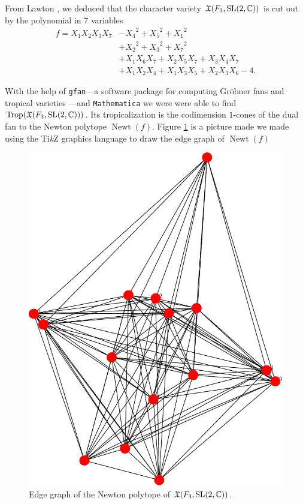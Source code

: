\documentclass[11pt]{article}
\DeclareMathOperator{\Newt}{Newt}
\begin{document}
From Lawton \cite{}, we deduced that the character variety
$\mathfrak{X}(F_3,\mathrm{SL}(2,\mathbb{C}))$ is cut out by the polynomial in $7$ variables
\begin{equation}
  \label{eq:f3-sl2c}
  \begin{aligned}
    f=X_1X_2X_3X_7&-{X_4}^2+{X_5}^2+{X_1}^2\\
    &+{X_2}^2+{X_3}^2+{X_7}^2\\
    &+X_1X_6X_7+X_2X_5X_7+X_3X_4X_7\\
    &+X_1X_2X_4+X_1X_3X_5+X_2X_3X_6-4.
  \end{aligned}
\end{equation}

With the help of \texttt{gfan}---a software package for computing Gröbner
fans and tropical varieties \cite{gfan}---and \texttt{Mathematica} we were
were able to find $\operatorname{Trop}(\mathfrak{X}(F_3,\mathrm{SL}(2,\mathbb{C})))$. Its tropicalization is
the codimension $1$-cones of the dual fan to the Newton polytope
$\Newt(f)$. Figure \ref{fig:f3-sl2c} is a picture made we made using the
Ti\textit{k}Z graphics language to draw the edge graph of $\Newt(f)$

\begin{figure}[h]
  \centering
  \includegraphics[scale=.25]{smallgraph}
  \caption{Edge graph of the Newton polytope of $\mathfrak{X}(F_3,\mathrm{SL}(2,\mathbb{C}))$.}
\label{fig:f3-sl2c}
\end{figure}



\end{document}
